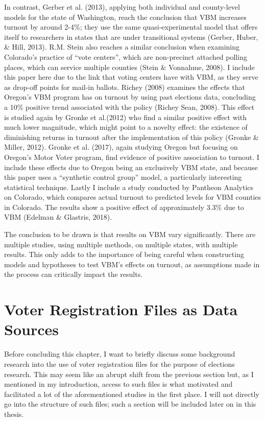 \documentclass[12pt,twoside]{reedthesis}
\begin{document}
  In contrast, Gerber et al. (2013), applying both individual and
  county-level models for the state of Washington, reach the conclusion
  that VBM increases turnout by around 2-4\%; they use the same
  quasi-experimental model that offers itself to researchers in states
  that are under transitional systems (Gerber, Huber, \& Hill, 2013). R.M.
  Stein also reaches a similar conclusion when examining Colorado's
  practice of ``vote centers'', which are non-precinct attached polling
  places, which can service multiple counties (Stein \& Vonnahme, 2008). I
  include this paper here due to the link that voting centers have with
  VBM, as they serve as drop-off points for mail-in ballots. Richey (2008)
  examines the effects that Oregon's VBM program has on turnout by using
  past elections data, concluding a 10\% positive trend associated with
  the policy (Richey Sean, 2008). This effect is studied again by Gronke
  et al.(2012) who find a similar positive effect with much lower
  magnitude, which might point to a novelty effect: the existence of
  diminishing returns in turnout after the implementation of this policy
  (Gronke \& Miller, 2012). Gronke et al. (2017), again studying Oregon
  but focusing on Oregon's Motor Voter program, find evidence of positive
  association to turnout. I include these effects due to Oregon being an
  exclusively VBM state, and because this paper uses a ``synthetic control
  group'' model, a particularly interesting statistical technique. Lastly
  I include a study conducted by Pantheon Analytics on Colorado, which
  compares actual turnout to predicted levels for VBM counties in
  Colorado. The results show a positive effect of approximately 3.3\% due
  to VBM (Edelman \& Glastris, 2018).
  
  The conclusion to be drawn is that results on VBM vary significantly.
  There are multiple studies, using multiple methods, on multiple states,
  with multiple results. This only adds to the importance of being careful
  when constructing models and hypotheses to test VBM's effects on
  turnout, as assumptions made in the process can critically impact the
  results.
  
  \section{Voter Registration Files as Data
  Sources}\label{voter-registration-files-as-data-sources}
  
  Before concluding this chapter, I want to briefly discuss some
  background research into the use of voter registration files for the
  purpose of elections research. This may seem like an abrupt shift from
  the previous section but, as I mentioned in my introduction, access to
  such files is what motivated and facilitated a lot of the aforementioned
  studies in the first place. I will not directly go into the structure of
  such files; such a section will be included later on in this thesis.
  
\end{document}

